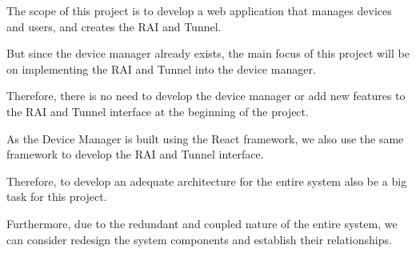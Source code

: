 The scope of this project is to develop a web application 
that manages devices and users, and creates the RAI and Tunnel.

But since the device manager already exists, 
the main focus of this project will be on implementing the RAI and Tunnel 
into the device manager.

Therefore, there is no need to develop the device manager 
or add new features to the RAI and Tunnel interface at the beginning of the project.

As the Device Manager is built using the React framework, 
we also use the same framework to develop the RAI and Tunnel interface.

Therefore, to develop an adequate architecture for the entire system also 
be a big task for this project. 

Furthermore, due to the redundant and coupled nature of the entire system, 
we can consider redesign the system components and establish their relationships.
